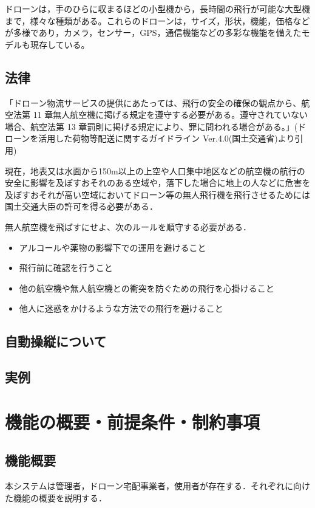 \documentclass[a4paper, titlepage]{jsarticle}
\begin{document}
ドローンは，手のひらに収まるほどの小型機から，長時間の飛行が可能な大型機まで，様々な種類がある。これらのドローンは，サイズ，形状，機能，価格などが多様であり，カメラ，センサー，GPS，通信機能などの多彩な機能を備えたモデルも現存している。

\subsection{法律}
「ドローン物流サービスの提供にあたっては、飛行の安全の確保の観点から、航空法第 11 章無人航空機に掲げる規定を遵守する必要がある。遵守されていない場合、航空法第 13 章罰則に掲げる規定により、罪に問われる場合がある。」(ドローンを活用した荷物等配送に関するガイドライン Ver.4.0(国土交通省)\cite{delivery_guidelines_2023}より引用)

現在，地表又は水面から150m以上の上空や人口集中地区などの航空機の航行の安全に影響を及ぼすおそれのある空域や，落下した場合に地上の人などに危害を及ぼすおそれが高い空域においてドローン等の無人飛行機を飛行させるためには国土交通大臣の許可を得る必要がある．

無人航空機を飛ばすにせよ、次のルールを順守する必要がある．\cite{prohibited_guidelines}
\begin{itemize}
        \item アルコールや薬物の影響下での運用を避けること
        \item 飛行前に確認を行うこと
        \item 他の航空機や無人航空機との衝突を防ぐための飛行を心掛けること
        \item 他人に迷惑をかけるような方法での飛行を避けること
\end{itemize}

\subsection{自動操縦について}
\subsection{実例}

\section{機能の概要・前提条件・制約事項}
\subsection{機能概要}
本システムは管理者，ドローン宅配事業者，使用者が存在する．それぞれに向けた機能の概要を説明する．
\end{document}
